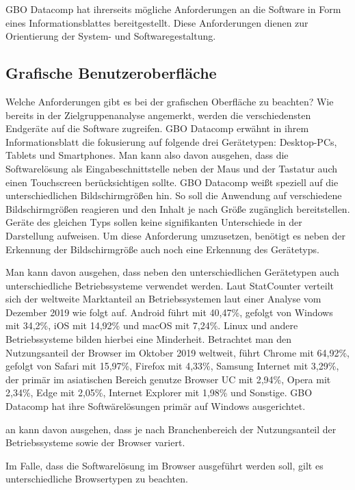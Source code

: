 GBO Datacomp hat ihrerseits mögliche Anforderungen an die Software in Form eines Informationsblattes
bereitgestellt. Diese Anforderungen dienen zur Orientierung der System- und Softwaregestaltung. 

\subsection{Grafische Benutzeroberfläche}
Welche Anforderungen gibt es bei der grafischen Oberfläche zu beachten? Wie bereits
in der Zielgruppenanalyse angemerkt, werden die verschiedensten Endgeräte auf die
Software zugreifen. GBO Datacomp erwähnt in ihrem Informationsblatt die fokusierung auf folgende
drei Gerätetypen: Desktop-PCs, Tablets und Smartphones. Man kann also davon ausgehen, dass die
Softwarelösung als Eingabeschnittstelle neben der Maus und der Tastatur auch einen Touchscreen
berücksichtigen sollte. GBO Datacomp weißt speziell auf die unterschiedlichen Bildschirmgrößen
hin. So soll die Anwendung auf verschiedene Bildschirmgrößen reagieren und den Inhalt je nach
Größe zugänglich bereitstellen. Geräte des gleichen Typs sollen keine signifikanten Unterschiede
in der Darstellung aufweisen. Um diese Anforderung umzusetzen, benötigt es neben der Erkennung
der Bildschirmgröße auch noch eine Erkennung des Gerätetyps.

Man kann davon ausgehen, dass neben den unterschiedlichen Gerätetypen auch unterschiedliche
Betriebssysteme verwendet werden. Laut StatCounter verteilt sich der weltweite Marktanteil
an Betriebssystemen laut einer Analyse vom Dezember 2019 wie folgt auf. Android führt mit
40,47\%, gefolgt von Windows mit 34,2\%, iOS mit 14,92\% und macOS mit 7,24\%. Linux und andere
Betriebssysteme bilden hierbei eine Minderheit.\cite{StatCounterOSMarketShare} Betrachtet man den
Nutzungsanteil der Browser im Oktober 2019 weltweit, führt Chrome mit 64,92\%, gefolgt von Safari mit 15,97\%,
Firefox mit 4,33\%, Samsung Internet mit 3,29\%, der primär im asiatischen Bereich genutze Browser UC
mit 2,94\%, Opera mit 2,34\%, Edge mit 2,05\%, Internet Explorer mit 1,98\% und Sonstige.\cite{StatCounterBrowserMarketShare}
GBO Datacomp hat ihre Softwärelösungen primär auf Windows ausgerichtet. 


an kann davon ausgehen, dass je nach Branchenbereich der Nutzungsanteil der Betriebssysteme
sowie der Browser variert. 


Im Falle, dass die Softwarelösung im Browser ausgeführt werden
soll, gilt es unterschiedliche Browsertypen zu beachten. 



